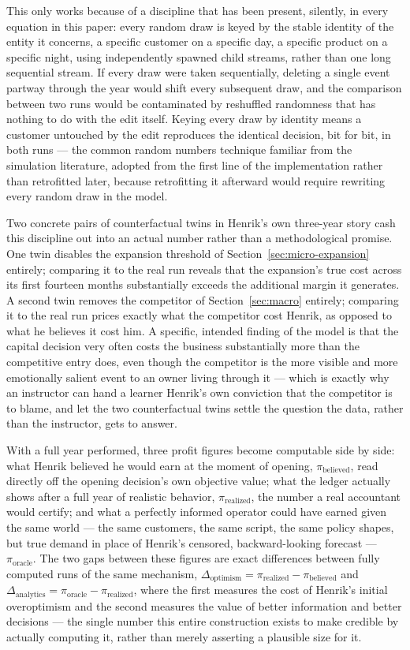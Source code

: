 \documentclass[12pt,a4paper]{article}
\begin{document}
This only works because of a discipline that has been present, silently,
in every equation in this paper: every random draw is keyed by the
stable identity of the entity it concerns, a specific customer on a
specific day, a specific product on a specific night, using
independently spawned child streams, rather than one long sequential
stream. If every draw were taken sequentially, deleting a single event
partway through the year would shift every subsequent draw, and the
comparison between two runs would be contaminated by reshuffled
randomness that has nothing to do with the edit itself. Keying every
draw by identity means a customer untouched by the edit reproduces the
identical decision, bit for bit, in both runs --- the common random
numbers technique familiar from the simulation literature, adopted from
the first line of the implementation rather than retrofitted later,
because retrofitting it afterward would require rewriting every random
draw in the model.

Two concrete pairs of counterfactual twins in Henrik's own three-year
story cash this discipline out into an actual number rather than a
methodological promise. One twin disables the expansion threshold of
Section~\ref{sec:micro-expansion} entirely; comparing it to the real
run reveals that the expansion's true cost across its first fourteen
months substantially exceeds the additional margin it generates. A
second twin removes the competitor of Section~\ref{sec:macro} entirely;
comparing it to the real run prices exactly what the competitor cost
Henrik, as opposed to what he believes it cost him. A specific, intended
finding of the model is that the capital decision very often costs the
business substantially more than the competitive entry does, even
though the competitor is the more visible and more emotionally salient
event to an owner living through it --- which is exactly why an
instructor can hand a learner Henrik's own conviction that the
competitor is to blame, and let the two counterfactual twins settle the
question the data, rather than the instructor, gets to answer.

With a full year performed, three profit figures become computable side
by side: what Henrik believed he would earn at the moment of opening,
$\pi_{\text{believed}}$, read directly off the opening decision's own
objective value; what the ledger actually shows after a full year of
realistic behavior, $\pi_{\text{realized}}$, the number a real
accountant would certify; and what a perfectly informed operator could
have earned given the same world --- the same customers, the same
script, the same policy shapes, but true demand in place of Henrik's
censored, backward-looking forecast --- $\pi_{\text{oracle}}$. The two
gaps between these figures are exact differences between fully computed
runs of the same mechanism, $\Delta_{\text{optimism}} =
\pi_{\text{realized}} - \pi_{\text{believed}}$ and
$\Delta_{\text{analytics}} = \pi_{\text{oracle}} - \pi_{\text{realized}}$,
where the first measures the cost of Henrik's initial overoptimism and
the second measures the value of better information and better
decisions --- the single number this entire construction exists to make
credible by actually computing it, rather than merely asserting a
plausible size for it.
\end{document}
